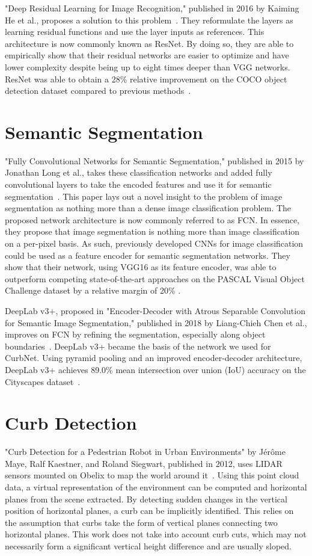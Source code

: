 "Deep Residual Learning for Image Recognition," published in 2016 by Kaiming He et al., proposes a solution to this problem~\cite{resnet}.
They reformulate the layers as learning residual functions and use the layer inputs as references.
This architecture is now commonly known as ResNet.
By doing so, they are able to empirically show that their residual networks are easier to optimize and have lower complexity despite being up to eight times deeper than VGG networks.
ResNet was able to obtain a 28\% relative improvement on the COCO object detection dataset compared to previous methods~\cite{coco}.

\section{Semantic Segmentation}\label{section:relatedwork-segmentation}
"Fully Convolutional Networks for Semantic Segmentation," published in 2015 by Jonathan Long et al., takes these classification networks and added fully convolutional layers to take the encoded features and use it for semantic segmentation~\cite{fcn}.
This paper lays out a novel insight to the problem of image segmentation as nothing more than a dense image classification problem.
The proposed network architecture is now commonly referred to as FCN.
In essence, they propose that image segmentation is nothing more than image classification on a per-pixel basis.
As such, previously developed CNNs for image classification could be used as a feature encoder for semantic segmentation networks.
They show that their network, using VGG16 as its feature encoder, was able to outperform competing state-of-the-art approaches on the PASCAL Visual Object Challenge dataset by a relative margin of 20\% \cite{pascal}.

DeepLab v3+, proposed in "Encoder-Decoder with Atrous Separable Convolution for Semantic Image Segmentation," published in 2018 by Liang-Chieh Chen et al., improves on FCN by refining the segmentation, especially along object boundaries~\cite{deeplab}.
DeepLab v3+ became the basis of the network we used for CurbNet.
Using pyramid pooling and an improved encoder-decoder architecture, DeepLab v3+ achieves 89.0\% mean intersection over union (IoU) accuracy on the Cityscapes dataset~\cite{cityscapes}.

\section{Curb Detection}\label{section:relatedwork-curbdetection}
"Curb Detection for a Pedestrian Robot in Urban Environments" by Jérôme Maye, Ralf Kaestner, and Roland Siegwart, published in 2012, uses LIDAR sensors mounted on Obelix to map the world around it~\cite{ethobelix}.
Using this point cloud data, a virtual representation of the environment can be computed and horizontal planes from the scene extracted.
By detecting sudden changes in the vertical position of horizontal planes, a curb can be implicitly identified.
This relies on the assumption that curbs take the form of vertical planes connecting two horizontal planes.
This work does not take into account curb cuts, which may not necessarily form a significant vertical height difference and are usually sloped.

